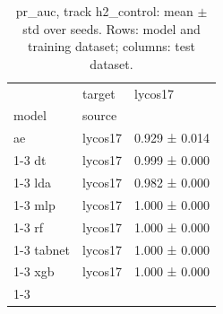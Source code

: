 \begin{table}
\caption{pr_auc, track h2_control: mean $\pm$ std over seeds. Rows: model and training dataset; columns: test dataset.}
\label{tab:matrix_h2_control_pr_auc}
\begin{tabular}{lll}
\toprule
 & target & lycos17 \\
model & source &  \\
\midrule
ae & lycos17 & 0.929 ± 0.014 \\
\cline{1-3}
dt & lycos17 & 0.999 ± 0.000 \\
\cline{1-3}
lda & lycos17 & 0.982 ± 0.000 \\
\cline{1-3}
mlp & lycos17 & 1.000 ± 0.000 \\
\cline{1-3}
rf & lycos17 & 1.000 ± 0.000 \\
\cline{1-3}
tabnet & lycos17 & 1.000 ± 0.000 \\
\cline{1-3}
xgb & lycos17 & 1.000 ± 0.000 \\
\cline{1-3}
\bottomrule
\end{tabular}
\end{table}
